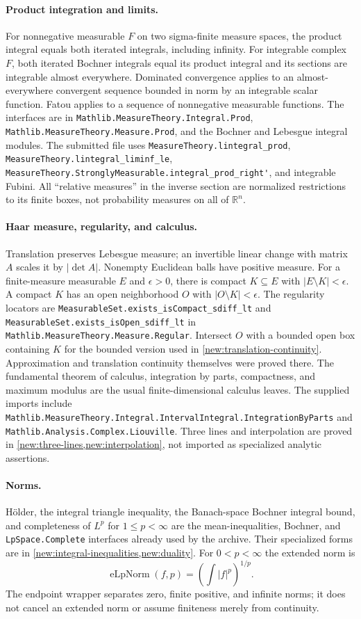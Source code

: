 \documentclass[11pt]{article}
\theoremstyle{definition}
\newcommand{\pid}[1]{\nolinkurl{#1}}
\newcommand{\R}{\mathbb R}
\begin{document}
\paragraph{Product integration and limits.}
For nonnegative measurable $F$ on two sigma-finite measure spaces, the product integral equals
both iterated integrals, including infinity. For integrable complex $F$, both iterated Bochner
integrals equal its product integral and its sections are integrable almost everywhere.
Dominated convergence applies to an almost-everywhere convergent sequence bounded in norm by
an integrable scalar function. Fatou applies to a sequence of nonnegative measurable functions.
The interfaces are in \pid{Mathlib.MeasureTheory.Integral.Prod},
\pid{Mathlib.MeasureTheory.Measure.Prod}, and the Bochner and Lebesgue integral modules.
The submitted file uses \pid{MeasureTheory.lintegral_prod},
\pid{MeasureTheory.lintegral_liminf_le},
\pid{MeasureTheory.StronglyMeasurable.integral_prod_right'}, and integrable Fubini.
All ``relative measures'' in the inverse section are normalized restrictions to its finite
boxes, not probability measures on all of $\R^n$.

\paragraph{Haar measure, regularity, and calculus.}
Translation preserves Lebesgue measure; an invertible linear change with matrix $A$ scales
it by $|\det A|$. Nonempty Euclidean balls have positive measure. For a finite-measure
measurable $E$ and $\epsilon>0$, there is compact $K\subseteq E$ with
$|E\setminus K|<\epsilon$. A compact $K$ has an open neighborhood $O$ with
$|O\setminus K|<\epsilon$. The regularity locators are
\pid{MeasurableSet.exists_isCompact_sdiff_lt} and
\pid{MeasurableSet.exists_isOpen_sdiff_lt} in
\pid{Mathlib.MeasureTheory.Measure.Regular}. Intersect $O$ with a bounded open box
containing $K$ for the bounded version used in \cref{new:translation-continuity}.
Approximation and translation continuity themselves were proved there.
The fundamental theorem of calculus, integration by parts, compactness, and maximum modulus
are the usual finite-dimensional calculus leaves. The supplied imports include
\pid{Mathlib.MeasureTheory.Integral.IntervalIntegral.IntegrationByParts} and
\pid{Mathlib.Analysis.Complex.Liouville}. Three lines and interpolation are proved in
\cref{new:three-lines,new:interpolation}, not imported as specialized analytic assertions.

\paragraph{Norms.}
H\"older, the integral triangle inequality, the Banach-space Bochner integral bound, and
completeness of $L^p$ for $1\leq p<\infty$ are the mean-inequalities, Bochner, and
\pid{LpSpace.Complete} interfaces already used by the archive. Their specialized forms are
in \cref{new:integral-inequalities,new:duality}. For $0<p<\infty$ the extended norm is
\[
 \operatorname{eLpNorm}(f,p)=\left(\int |f|^p\right)^{1/p}.
\]
The endpoint wrapper separates zero, finite positive, and infinite norms; it does not cancel
an extended norm or assume finiteness merely from continuity.
\end{document}

